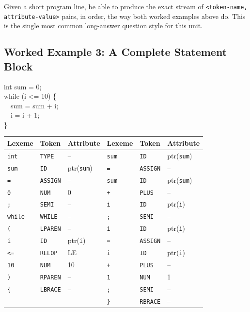 \documentclass[11pt]{article}
\begin{document}
\begin{examfocus}
Given a short program line, be able to produce the exact stream of
\texttt{<token-name, attribute-value>} pairs, in order, the way both worked examples above do.
This is the single most common long-answer question style for this unit.
\end{examfocus}

\subsection{Worked Example 3: A Complete Statement Block}

\begin{center}
\begin{minipage}{0.5\textwidth}
\ttfamily
int sum = 0;\\
while (i <= 10) \{\\
\ \ sum = sum + i;\\
\ \ i = i + 1;\\
\}
\end{minipage}
\end{center}

\begin{center}
\renewcommand{\arraystretch}{1.15}
\footnotesize
\begin{tabularx}{\textwidth}{@{}l l X | l l X@{}}
\toprule
\textbf{Lexeme} & \textbf{Token} & \textbf{Attribute} & \textbf{Lexeme} & \textbf{Token} & \textbf{Attribute} \\
\midrule
\texttt{int} & \texttt{TYPE} & -- & \texttt{sum} & \texttt{ID} & ptr(\texttt{sum}) \\
\texttt{sum} & \texttt{ID} & ptr(\texttt{sum}) & \texttt{=} & \texttt{ASSIGN} & -- \\
\texttt{=} & \texttt{ASSIGN} & -- & \texttt{sum} & \texttt{ID} & ptr(\texttt{sum}) \\
\texttt{0} & \texttt{NUM} & 0 & \texttt{+} & \texttt{PLUS} & -- \\
\texttt{;} & \texttt{SEMI} & -- & \texttt{i} & \texttt{ID} & ptr(\texttt{i}) \\
\texttt{while} & \texttt{WHILE} & -- & \texttt{;} & \texttt{SEMI} & -- \\
\texttt{(} & \texttt{LPAREN} & -- & \texttt{i} & \texttt{ID} & ptr(\texttt{i}) \\
\texttt{i} & \texttt{ID} & ptr(\texttt{i}) & \texttt{=} & \texttt{ASSIGN} & -- \\
\texttt{<=} & \texttt{RELOP} & LE & \texttt{i} & \texttt{ID} & ptr(\texttt{i}) \\
\texttt{10} & \texttt{NUM} & 10 & \texttt{+} & \texttt{PLUS} & -- \\
\texttt{)} & \texttt{RPAREN} & -- & \texttt{1} & \texttt{NUM} & 1 \\
\texttt{\{} & \texttt{LBRACE} & -- & \texttt{;} & \texttt{SEMI} & -- \\
 & & & \texttt{\}} & \texttt{RBRACE} & -- \\
\bottomrule
\end{tabularx}
\end{center}
\end{document}
